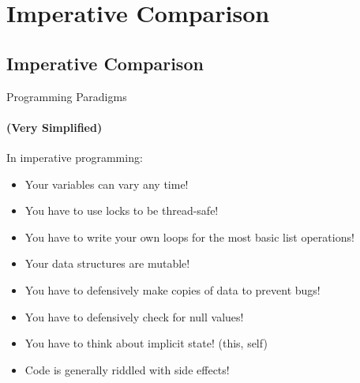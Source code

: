 \documentclass[mathserif]{beamer}
\begin{document}
\section{Imperative Comparison}
\subsection{Imperative Comparison}

\begin{frame}{Programming Paradigms}
  \framesubtitle{(Very Simplified)}
\end{frame}

\begin{frame}

  In imperative programming:

  \begin{itemize}[<+->]
  \item Your variables can vary any time!
  \item You have to use locks to be thread-safe!
  \item You have to write your own loops for the most basic list operations!
  \item Your data structures are mutable!
  \item You have to defensively make copies of data to prevent bugs!
  \item You have to defensively check for null values!
  \item You have to think about implicit state! (this, self)
  \item Code is generally riddled with side effects!
  \end{itemize}
\end{frame}
\end{document}
